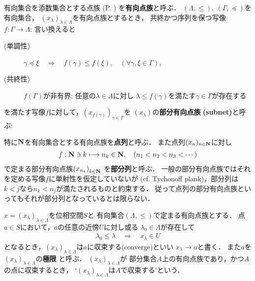 	\begin{screen}
		\begin{dfn}[有向点族]
			有向集合を添数集合とする点族
			(P. \pageref{dfn:family_collection})
			を{\bf 有向点族}と呼ぶ．
			$(\Lambda,\leq),\ (\Gamma,\preceq)$を有向集合，
			$(x_\lambda)_{\lambda \in \Lambda}$を有向点族とするとき，
			共終かつ序列を保つ写像$f:\Gamma \longrightarrow \Lambda$:
			言い換えると
			\begin{description}
				\item[(単調性)] $\gamma \preceq \xi \quad \Longrightarrow \quad
					f(\gamma) \leq f(\xi),\quad (\forall \gamma,\xi \in \Gamma)$,
				\item[(共終性)] $f(\Gamma)$が非有界:
					任意の$\lambda \in \Lambda$に対し
					$\lambda \leq f(\gamma)$を満たす$\gamma \in \Gamma$が存在する
			\end{description}
			を満たす写像$f$に対して，$\left(x_{f(\gamma)}\right)_{\gamma \in \Gamma}$を
			$(x_\lambda)$の{\bf 部分有向点族}
			{\bf (subnet)}と呼ぶ:
		\end{dfn}
	\end{screen}
	特に$\mathbf{N}$を有向集合とする有向点族を{\bf 点列}と呼ぶ．
	また点列$(x_n)_{n \in \mathbf{N}}$に対し
	\begin{align}
		f:\mathbf{N} \ni k \longmapsto n_k \in \mathbf{N},
		\quad (n_1 < n_2 < n_3 < \cdots)
	\end{align}
	で定まる部分有向点族$\left(x_{n_k}\right)_{k \in \mathbf{N}}$
	を{\bf 部分列}と呼ぶ．
	一般の部分有向点族ではそれを定める写像$f$に単射性を仮定していないが
	(cf. Tychonoff plank)，部分列は$k < j$なら$n_k < n_j$が満たされるものと約束する．
	従って点列の部分有向点族といってもそれが部分列となっているとは限らない．
	
	\begin{screen}
		\begin{dfn}
			$x = (x_\lambda)_{\lambda \in \Lambda}$を位相空間$S$と
			有向集合$(\Lambda,\leq)$で定まる有向点族とする．
			点$a \in S$において，$a$の任意の近傍$U$に対し或る
			$\lambda_0 \in \Lambda$が存在して
			\begin{align}
				\lambda_0 \leq \lambda \quad \Longrightarrow \quad
				x_\lambda \in U
			\end{align}
			となるとき，$(x_\lambda)_{\lambda \in \Lambda}$は$a$に収束する(converge)といい
			$x_\lambda \longrightarrow a$と書く．
			また$a$を$(x_\lambda)_{\lambda \in \Lambda}$の{\bf 極限}
			\index{きょくげん@極限}{\bf (limit)}と呼ぶ．
			$(x_\lambda)_{\lambda \in \Lambda}$が
			部分集合$A$上の有向点族であり，かつ$A$の点に収束するとき，
			`$(x_\lambda)_{\lambda \in \Lambda}$は$A$で収束する'という．
		\end{dfn}
	\end{screen}
	
